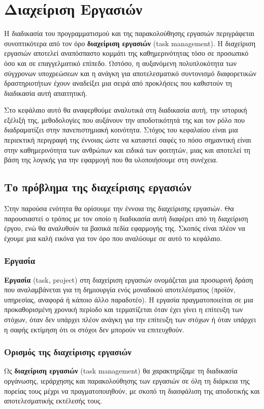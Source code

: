 \chapter{Διαχείριση Εργασιών}
    Η διαδικασία του προγραμματισμού και της παρακολούθησης εργασιών περιγράφεται συνοπτικότερα από τον όρο \textbf{διαχείριση εργασιών} (task management). Η διαχείριση εργασιών αποτελεί αναπόσπαστο κομμάτι της καθημερινότητας τόσο σε προσωπικό όσο και σε επαγγελματικό επίπεδο. Ωστόσο, η αυξανόμενη πολυπλοκότητα των σύγχρονων υποχρεώσεων και η ανάγκη για αποτελεσματικό συντονισμό διαφορετικών δραστηριοτήτων έχουν αναδείξει μια σειρά από προκλήσεις που καθιστούν τη διαδικασία αυτή απαιτητική.

    Στο κεφάλαιο αυτό θα αναφερθούμε αναλυτικά στη διαδικασία αυτή, την ιστορική εξέλιξή της, μεθοδολογίες που αυξάνουν την αποδοτικότητά της και τον ρόλο που διαδραματίζει στην πανεπιστημιακή κοινότητα. Στόχος του κεφαλαίου είναι μια περιεκτική περιγραφή της έννοιας ώστε να καταστεί σαφές το πόσο σημαντική είναι στην καθημερινότητα των ανθρώπων και ειδικά των φοιτητών, μιας και αποτελεί τη βάση της λογικής για την εφαρμογή που θα υλοποιήσουμε στη συνέχεια.

    \section{Το πρόβλημα της διαχείρισης εργασιών}
        Στην παρούσα ενότητα θα ορίσουμε την έννοια της διαχείρισης εργασιών. Θα παρουσιαστεί ο τρόπος με τον οποίο η διαδικασία αυτή διαφέρει από τη διαχείριση έργου, ενώ θα αναλυθούν τα βασικά πεδία εφαρμογής της. Σκοπός είναι πλέον να έχουμε μια καλή εικόνα για τον όρο που αναλύουμε σε αυτό το κεφάλαιο.

        \subsection{Εργασία}
            \textbf{Εργασία} (task, project) στη διαχείριση εργασιών ονομάζεται μια προσωρινή δράση που αναλαμβάνεται για τη δημιουργία ενός μοναδικού αποτελέσματος (προϊόν, υπηρεσίας, αναφορά ή κάποιο άλλο παραδοτέο). Η εργασία πραγματοποιείται σε μια προκαθορισμένη χρονική περίοδο και τερματίζεται όταν έχει γίνει η επίτευξη των στόχων, όταν δεν υπάρχει πλέον ανάγκη για την επίτευξη των στόχων ή όταν υπάρχει η σαφής εκτίμηση ότι οι στόχοι δεν μπορούν να επιτευχθούν. \cite{PMBOK}

        \subsection{Ορισμός της διαχείρισης εργασιών}
            Ως \textbf{διαχείριση εργασιών} (task management) θα χαρακτηρίζαμε τη διαδικασία οργάνωσης, ιεράρχησης και παρακολούθησης των εργασιών σε όλη τη διάρκεια της πορείας τους μέχρι να πραγματοποιηθούν, με σκοπό τη διασφάλιση της αποδοτικής και αποτελεσματικής εκτέλεσής τους.

